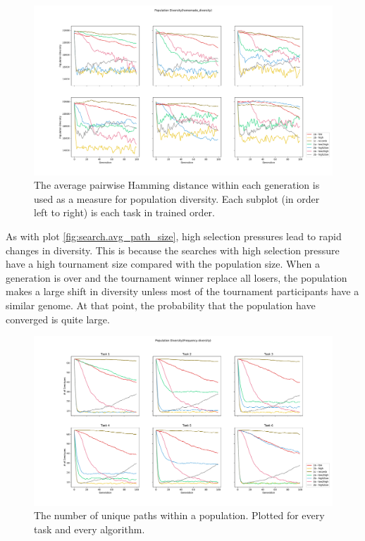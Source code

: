 \begin{figure}[p!]%
    \includegraphics[width=\textwidth]{Chapters/Experiments/search_algo/figures/Average_population_diversity_reduced_hamming.png}
    \caption{The average pairwise Hamming distance within each generation is used as a measure for population diversity. Each subplot (in order left to right) is each task in trained order.}
    \label{fig:search.hamming_diversity}
\end{figure}

As with plot \ref{fig:search.avg_path_size}, high selection pressures lead to rapid changes in diversity. This is because the searches with high selection pressure have a high tournament size compared with the population size. When a generation is over and  the tournament winner replace all losers, the population makes a large shift in diversity unless most of the tournament participants have a similar genome. At that point, the probability that the population have converged is quite large. 

\begin{figure}[p!]%
    \includegraphics[width=\textwidth]{Chapters/Experiments/search_algo/figures/frequency_diversity_unique_path_count.pdf}
    \caption{The number of unique paths within a population. Plotted for every task and every algorithm.}
    \label{fig:search.frequency_diversity_unique}
\end{figure}


